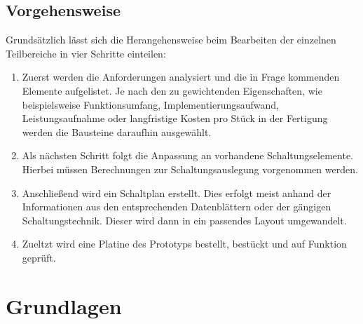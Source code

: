 \documentclass[12pt]{scrreprt} %
\begin{document}
\section{Vorgehensweise}
Grundsätzlich lässt sich die Herangehensweise beim Bearbeiten der einzelnen Teilbereiche in vier Schritte einteilen:
\begin{enumerate}
\item
Zuerst werden die Anforderungen analysiert und die in Frage kommenden Elemente aufgelistet. Je nach den zu gewichtenden Eigenschaften, wie beispielsweise Funktionsumfang, Implementierungsaufwand, Leistungsaufnahme oder langfristige Kosten pro Stück in der Fertigung werden die Bausteine daraufhin ausgewählt.
\item
Als nächsten Schritt folgt die Anpassung an vorhandene Schaltungselemente. Hierbei müssen Berechnungen zur Schaltungsauslegung vorgenommen werden. 
\item
Anschließend wird ein Schaltplan erstellt. Dies erfolgt meist anhand der Informationen aus den entsprechenden Datenblättern oder der gängigen Schaltungstechnik. Dieser wird dann in ein passendes Layout umgewandelt. 
\item
Zueltzt wird eine Platine des Prototyps bestellt, bestückt und auf Funktion geprüft. 
\end{enumerate}
\chapter{Grundlagen}
\end{document}
